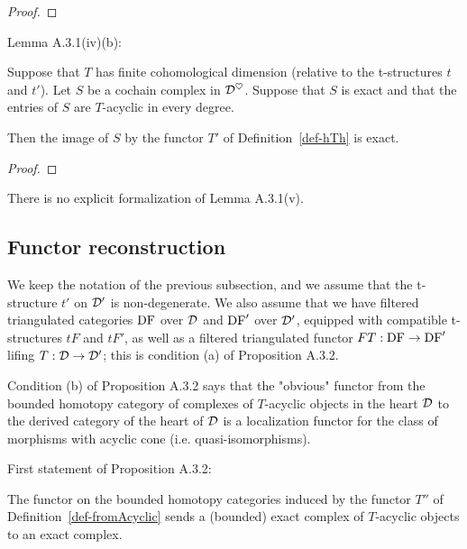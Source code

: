 \begin{proof}
\leanok
\end{proof}


Lemma A.3.1(iv)(b):

\begin{lemma}
\label{prop-exact_map_of_exact_acyclic_complex_and_bounded_functor}
\leanok 
{}
Suppose that $T$ has finite cohomological dimension (relative to the t-structures $t$ and $t'$).
Let $S$ be a cochain complex in $\mathcal{D}^\heartsuit$.
Suppose that $S$ is exact  and that
the entries of $S$ are $T$-acyclic in every degree.

Then the image of $S$ by the functor $T'$ of Definition~\ref{def-hTh} is exact.

\end{lemma}

\begin{proof}
\leanok
\end{proof}


There is no explicit formalization of Lemma A.3.1(v).


\subsection{Functor reconstruction}

We keep the notation of the previous subsection, and we assume that the t-structure $t'$ on $\mathcal{D}'$ is 
non-degenerate. We also assume that we have filtered triangulated categories $\operatorname{DF}$ over $\mathcal{D}$ and 
$\operatorname{DF}'$ over $\mathcal{D}'$, equipped with compatible t-structures $tF$ and $tF'$, as well as a filtered triangulated 
functor $FT:\operatorname{DF}\to\operatorname{DF}'$ lifing $T:\mathcal{D}\to\mathcal{D}'$; this is condition (a) of Proposition A.3.2.

Condition (b) of Proposition A.3.2 says that the "obvious" functor from the bounded homotopy category of
complexes of $T$-acyclic objects in the heart $\mathcal{D}$ to the derived category of the heart of $\mathcal{D}$
is a localization functor for the class of morphisms with acyclic cone (i.e. quasi-isomorphisms).

First statement of Proposition A.3.2:
\begin{proposition}
\label{prop-AcyclicComplexAcyclic_image}
\leanok 
{}

The functor on the bounded homotopy categories induced by the functor $T''$ of 
Definition~\ref{def-fromAcyclic}
sends a (bounded) exact complex of $T$-acyclic objects to an exact complex.

\end{proposition}

